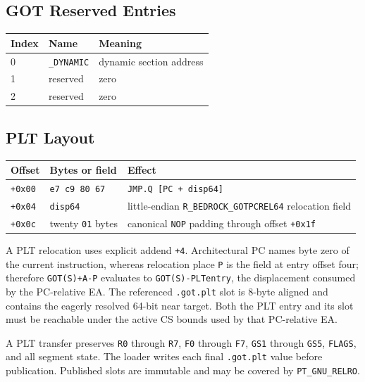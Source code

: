 \documentclass[10pt,twoside]{article}
\begin{document}
\subsection{GOT Reserved Entries}
\begingroup\footnotesize
\setlength{\tabcolsep}{2pt}
\begin{longtable}{@{}p{0.55in}p{1.55in}p{3.4in}@{}}
\toprule
\textbf{Index} & \textbf{Name} & \textbf{Meaning}\\
\midrule
\endhead
0 & \texttt{\_\allowbreak{}DYNAMIC} & dynamic section address\\
1 & reserved & zero\\
2 & reserved & zero\\
\bottomrule
\end{longtable}
\endgroup
\subsection{PLT Layout}
\begingroup\footnotesize
\setlength{\tabcolsep}{2pt}
\begin{longtable}{@{}p{0.75in}p{1.55in}p{3.20in}@{}}
\toprule
\textbf{Offset} & \textbf{Bytes or field} & \textbf{Effect}\\
\midrule
\endhead
\texttt{+0x00} & \texttt{e7 c9 80 67} & \texttt{JMP.Q [PC + disp64]}\\
\texttt{+0x04} & \texttt{disp64} & little-endian \texttt{R\_BEDROCK\_GOTPCREL64} relocation field\\
\texttt{+0x0c} & twenty \texttt{01} bytes & canonical \texttt{NOP} padding through offset \texttt{+0x1f}\\
\bottomrule
\end{longtable}
\endgroup

A PLT relocation uses explicit addend \texttt{+4}. Architectural PC names byte zero of the current instruction,
whereas relocation place \texttt{P} is the field at entry offset four; therefore
\texttt{GOT(S)+A-P} evaluates to \texttt{GOT(S)-PLTentry}, the displacement consumed by the PC-relative EA. The
referenced \texttt{.got.plt} slot is 8-byte aligned and contains the eagerly resolved 64-bit near target. Both the
PLT entry and its slot must be reachable under the active CS bounds used by that PC-relative EA.

A PLT transfer preserves \texttt{R0} through \texttt{R7}, \texttt{F0} through
\texttt{F7}, \texttt{GS1} through \texttt{GS5}, \texttt{FLAGS}, and all
segment state. The loader writes each final \texttt{.got.plt} value before
publication. Published slots are immutable and may be covered by
\texttt{PT\_GNU\_RELRO}.
\clearpage
\end{document}
